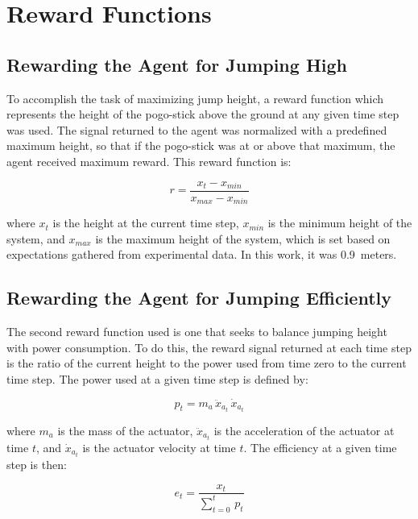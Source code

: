 \documentclass{ifacconf}
\begin{document}
\section{Reward Functions}

   \subsection{Rewarding the Agent for Jumping High}
      To accomplish the task of maximizing jump height, a reward function which represents the height of the pogo-stick above the ground at any given time step was used. The signal returned to the agent was normalized with a predefined maximum height, so that if the pogo-stick was at or above that maximum, the agent received maximum reward. This reward function is:

      \begin{equation} \label{eq:rewardHeight}
         r = \frac{x_t - x_{min}}{x_{max} - x_{min}}
      \end{equation}

      where $x_t$ is the height at the current time step, $x_{min}$ is the minimum height of the system, and $x_{max}$ is the maximum height of the system, which is set based on expectations gathered from experimental data. In this work, it was 0.9~meters.

   \subsection{Rewarding the Agent for Jumping Efficiently}
      The second reward function used is one that seeks to balance jumping height with power consumption. To do this, the reward signal returned at each time step is the ratio of the current height to the power used from time zero to the current time step. The power used at a given time step is defined by:
      
      \begin{equation} \label{eq:powerWRTTime}
         p_t = m_a\,\ddot{x}_{a_{t}}\,\dot{x}_{a_{t}}
      \end{equation} 
      
      where $m_a$ is the mass of the actuator, $\ddot{x}_{a_{t}}$ is the acceleration of the actuator at time $t$, and $\dot{x}_{a_{t}}$ is the actuator velocity at time $t$. The efficiency at a given time step is then:

      \begin{equation} \label{eq:efficiencyWRTTime}
         e_t = \frac{x_t}{\sum_{t=0}^{t}\,p_t}
      \end{equation}
\end{document}
